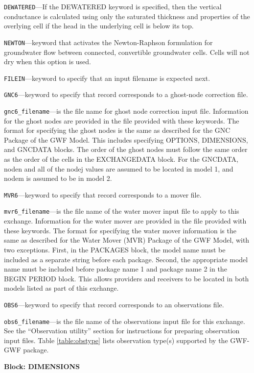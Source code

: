\begin{description}
\item \texttt{DEWATERED}---If the DEWATERED keyword is specified, then the vertical conductance is calculated using only the saturated thickness and properties of the overlying cell if the head in the underlying cell is below its top.

\item \texttt{NEWTON}---keyword that activates the Newton-Raphson formulation for groundwater flow between connected, convertible groundwater cells. Cells will not dry when this option is used.

\item \texttt{FILEIN}---keyword to specify that an input filename is expected next.

\item \texttt{GNC6}---keyword to specify that record corresponds to a ghost-node correction file.

\item \texttt{gnc6\_filename}---is the file name for ghost node correction input file.  Information for the ghost nodes are provided in the file provided with these keywords.  The format for specifying the ghost nodes is the same as described for the GNC Package of the GWF Model.  This includes specifying OPTIONS, DIMENSIONS, and GNCDATA blocks.  The order of the ghost nodes must follow the same order as the order of the cells in the EXCHANGEDATA block.  For the GNCDATA, noden and all of the nodej values are assumed to be located in model 1, and nodem is assumed to be in model 2.

\item \texttt{MVR6}---keyword to specify that record corresponds to a mover file.

\item \texttt{mvr6\_filename}---is the file name of the water mover input file to apply to this exchange.  Information for the water mover are provided in the file provided with these keywords.  The format for specifying the water mover information is the same as described for the Water Mover (MVR) Package of the GWF Model, with two exceptions.  First, in the PACKAGES block, the model name must be included as a separate string before each package.  Second, the appropriate model name must be included before package name 1 and package name 2 in the BEGIN PERIOD block.  This allows providers and receivers to be located in both models listed as part of this exchange.

\item \texttt{OBS6}---keyword to specify that record corresponds to an observations file.

\item \texttt{obs6\_filename}---is the file name of the observations input file for this exchange. See the ``Observation utility'' section for instructions for preparing observation input files. Table \ref{table:obstype} lists observation type(s) supported by the GWF-GWF package.

\end{description}
\item \textbf{Block: DIMENSIONS}

